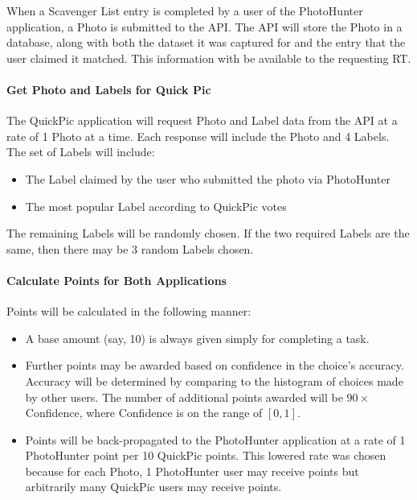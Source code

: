 \documentclass{article}
\begin{document}
When a Scavenger List entry is completed by a user of the PhotoHunter
application, a Photo is submitted to the API.  The API will store the Photo in
a database, along with both the dataset it was captured for and the entry that
the user claimed it matched.  This information with be available to the
requesting RT.

\paragraph{Get Photo and Labels for Quick Pic}

The QuickPic application will request Photo and Label data from the API at a
rate of 1 Photo at a time.  Each response will include the Photo and 4 Labels.
The set of Labels will include:

\begin{itemize}
  \item The Label claimed by the user who submitted the photo via PhotoHunter
  \item The most popular Label according to QuickPic votes
\end{itemize}

The remaining Labels will be randomly chosen.  If the two required Labels are
the same, then there may be 3 random Labels chosen.

\paragraph{Calculate Points for Both Applications}

Points will be calculated in the following manner:

\begin{itemize}
  \item A base amount (say, 10) is always given simply for completing a task.
  \item Further points may be awarded based on confidence in the choice's
    accuracy.  Accuracy will be determined by comparing to the histogram of
    choices made by other users.  The number of additional points awarded will
    be $90 \times$ Confidence, where Confidence is on the range of
    $[0, 1]$.

  \item Points will be back-propagated to the PhotoHunter application at a rate
    of 1 PhotoHunter point per 10 QuickPic points.  This lowered rate was
    chosen because for each Photo, 1 PhotoHunter user may receive points but
    arbitrarily many QuickPic users may receive points.
\end{itemize}
\end{document}
